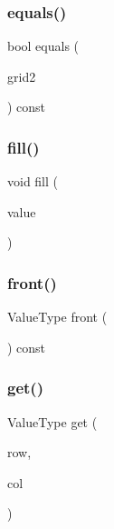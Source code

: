 \mbox{\label{classGrid_a9619d603ca957ce2be5b13198af5ee02}} 
\subsubsection{\texorpdfstring{equals()}{equals()}}
{\footnotesize\ttfamily bool equals (\begin{DoxyParamCaption}\item[{const \mbox{\hyperlink{classGrid}{Grid}}$<$ Value\+Type $>$ \&}]{grid2 }\end{DoxyParamCaption}) const}

\mbox{\label{classGrid_ac8f8ff1a5d0997596cbedbc2162e4649}} 
\subsubsection{\texorpdfstring{fill()}{fill()}}
{\footnotesize\ttfamily void fill (\begin{DoxyParamCaption}\item[{const Value\+Type \&}]{value }\end{DoxyParamCaption})}

\mbox{\label{classGrid_abaa174a9d74f7e7e38d4944fa43b5a33}} 
\subsubsection{\texorpdfstring{front()}{front()}}
{\footnotesize\ttfamily Value\+Type front (\begin{DoxyParamCaption}{ }\end{DoxyParamCaption}) const}

\mbox{\label{classGrid_a49fcb88bae29483f4cb0858f29f6384e}} 
\subsubsection{\texorpdfstring{get()}{get()}\hspace{0.1cm}{\footnotesize\ttfamily [1/4]}}
{\footnotesize\ttfamily Value\+Type get (\begin{DoxyParamCaption}\item[{int}]{row,  }\item[{int}]{col }\end{DoxyParamCaption})}

